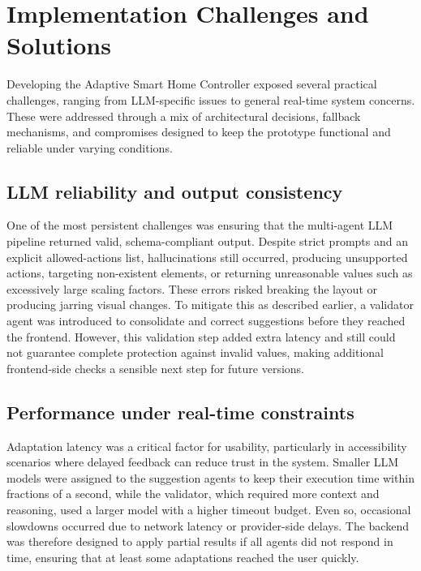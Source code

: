 \section{Implementation Challenges and Solutions}
Developing the Adaptive Smart Home Controller exposed several practical challenges, ranging from LLM-specific issues to general real-time system concerns. These were addressed through a mix of architectural decisions, fallback mechanisms, and compromises designed to keep the prototype functional and reliable under varying conditions.

\subsection{LLM reliability and output consistency}
One of the most persistent challenges was ensuring that the multi-agent LLM pipeline returned valid, schema-compliant output. Despite strict prompts and an explicit allowed-actions list, hallucinations still occurred, producing unsupported actions, targeting non-existent elements, or returning unreasonable values such as excessively large scaling factors. These errors risked breaking the layout or producing jarring visual changes. To mitigate this as described earlier, a validator agent was introduced to consolidate and correct suggestions before they reached the frontend. However, this validation step added extra latency and still could not guarantee complete protection against invalid values, making additional frontend-side checks a sensible next step for future versions.

\subsection{Performance under real-time constraints}
Adaptation latency was a critical factor for usability, particularly in accessibility scenarios where delayed feedback can reduce trust in the system. Smaller LLM models were assigned to the suggestion agents to keep their execution time within fractions of a second, while the validator, which required more context and reasoning, used a larger model with a higher timeout budget. Even so, occasional slowdowns occurred due to network latency or provider-side delays. The backend was therefore designed to apply partial results if all agents did not respond in time, ensuring that at least some adaptations reached the user quickly.


